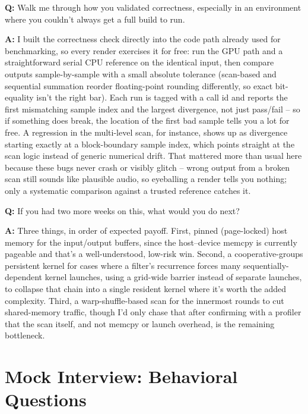 \documentclass[11pt]{article}
\newcommand{\Q}[1]{\vspace{0.6em}\noindent\textbf{\textcolor{blue!60!black}{Q:}} #1\par}
\newcommand{\A}[1]{\noindent\textbf{A:} #1\par}
\begin{document}
\Q{Walk me through how you validated correctness, especially in an environment where you couldn't always get a full build to run.}
\A{I built the correctness check directly into the code path already used for benchmarking, so every render exercises it for free: run the GPU path and a straightforward serial CPU reference on the identical input, then compare outputs sample-by-sample with a small absolute tolerance (scan-based and sequential summation reorder floating-point rounding differently, so exact bit-equality isn't the right bar). Each run is tagged with a call id and reports the first mismatching sample index and the largest divergence, not just pass/fail -- so if something does break, the location of the first bad sample tells you a lot for free. A regression in the multi-level scan, for instance, shows up as divergence starting exactly at a block-boundary sample index, which points straight at the scan logic instead of generic numerical drift. That mattered more than usual here because these bugs never crash or visibly glitch -- wrong output from a broken scan still sounds like plausible audio, so eyeballing a render tells you nothing; only a systematic comparison against a trusted reference catches it.}

\Q{If you had two more weeks on this, what would you do next?}
\A{Three things, in order of expected payoff. First, pinned (page-locked) host memory for the input/output buffers, since the host--device memcpy is currently pageable and that's a well-understood, low-risk win. Second, a cooperative-groups persistent kernel for cases where a filter's recurrence forces many sequentially-dependent kernel launches, using a grid-wide barrier instead of separate launches, to collapse that chain into a single resident kernel where it's worth the added complexity. Third, a warp-shuffle-based scan for the innermost rounds to cut shared-memory traffic, though I'd only chase that after confirming with a profiler that the scan itself, and not memcpy or launch overhead, is the remaining bottleneck.}

\section*{Mock Interview: Behavioral Questions}
\end{document}

